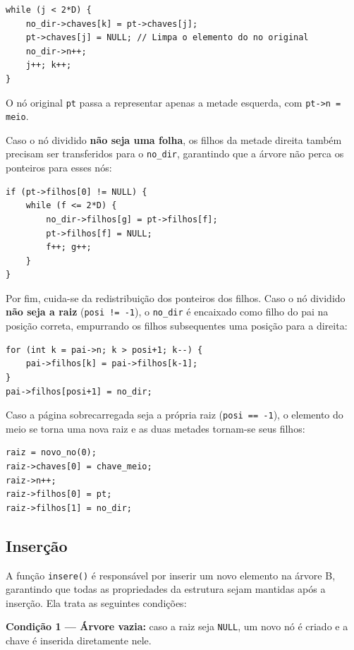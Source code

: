 \documentclass[12pt,a4paper]{article}
\begin{document}
\begin{lstlisting}
while (j < 2*D) {
    no_dir->chaves[k] = pt->chaves[j];
    pt->chaves[j] = NULL; // Limpa o elemento do no original
    no_dir->n++;
    j++; k++;
}
\end{lstlisting}

O nó original \texttt{pt} passa a representar apenas a metade esquerda, com \texttt{pt->n = meio}.

Caso o nó dividido \textbf{não seja uma folha}, os filhos da metade direita também precisam ser transferidos para o \texttt{no\_dir}, garantindo que a árvore não perca os ponteiros para esses nós:

\begin{lstlisting}
if (pt->filhos[0] != NULL) {
    while (f <= 2*D) {
        no_dir->filhos[g] = pt->filhos[f];
        pt->filhos[f] = NULL;
        f++; g++;
    }
}
\end{lstlisting}

Por fim, cuida-se da redistribuição dos ponteiros dos filhos. Caso o nó dividido \textbf{não seja a raiz} (\texttt{posi != -1}), o \texttt{no\_dir} é encaixado como filho do pai na posição correta, empurrando os filhos subsequentes uma posição para a direita:

\begin{lstlisting}
for (int k = pai->n; k > posi+1; k--) {
    pai->filhos[k] = pai->filhos[k-1];
}
pai->filhos[posi+1] = no_dir;
\end{lstlisting}

Caso a página sobrecarregada seja a própria raiz (\texttt{posi == -1}), o elemento do meio se torna uma nova raiz e as duas metades tornam-se seus filhos:

\begin{lstlisting}
raiz = novo_no(0);
raiz->chaves[0] = chave_meio;
raiz->n++;
raiz->filhos[0] = pt;
raiz->filhos[1] = no_dir;
\end{lstlisting}

\subsection{Inserção}

A função \texttt{insere()} é responsável por inserir um novo elemento na árvore B, garantindo que todas as propriedades da estrutura sejam mantidas após a inserção. Ela trata as seguintes condições:

\textbf{Condição 1 — Árvore vazia:} caso a raiz seja \texttt{NULL}, um novo nó é criado e a chave é inserida diretamente nele.
\end{document}
